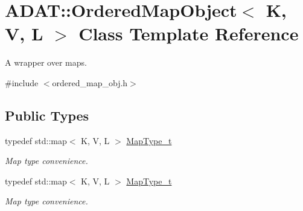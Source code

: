 \hypertarget{classADAT_1_1OrderedMapObject}{}\section{A\+D\+AT\+:\+:Ordered\+Map\+Object$<$ K, V, L $>$ Class Template Reference}
\label{classADAT_1_1OrderedMapObject}


A wrapper over maps.  




{\ttfamily \#include $<$ordered\+\_\+map\+\_\+obj.\+h$>$}

\subsection*{Public Types}
\begin{DoxyCompactItemize}
\item 
typedef std\+::map$<$ K, V, L $>$ \mbox{\hyperlink{classADAT_1_1OrderedMapObject_a4341262d590e4628319a61210534ab88}{Map\+Type\+\_\+t}}
\begin{DoxyCompactList}\small\item\em Map type convenience. \end{DoxyCompactList}\item 
typedef std\+::map$<$ K, V, L $>$ \mbox{\hyperlink{classADAT_1_1OrderedMapObject_a4341262d590e4628319a61210534ab88}{Map\+Type\+\_\+t}}
\begin{DoxyCompactList}\small\item\em Map type convenience. \end{DoxyCompactList}\end{DoxyCompactItemize}
